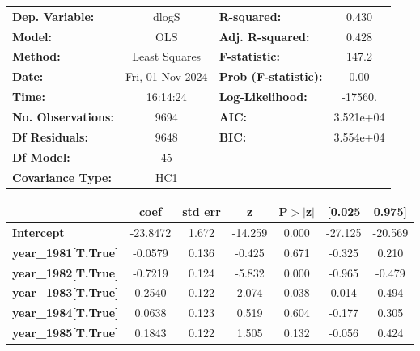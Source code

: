 \begin{center}
\begin{tabular}{lclc}
\toprule
\textbf{Dep. Variable:}     &      dlogS       & \textbf{  R-squared:         } &     0.430   \\
\textbf{Model:}             &       OLS        & \textbf{  Adj. R-squared:    } &     0.428   \\
\textbf{Method:}            &  Least Squares   & \textbf{  F-statistic:       } &     147.2   \\
\textbf{Date:}              & Fri, 01 Nov 2024 & \textbf{  Prob (F-statistic):} &     0.00    \\
\textbf{Time:}              &     16:14:24     & \textbf{  Log-Likelihood:    } &   -17560.   \\
\textbf{No. Observations:}  &        9694      & \textbf{  AIC:               } & 3.521e+04   \\
\textbf{Df Residuals:}      &        9648      & \textbf{  BIC:               } & 3.554e+04   \\
\textbf{Df Model:}          &          45      & \textbf{                     } &             \\
\textbf{Covariance Type:}   &       HC1        & \textbf{                     } &             \\
\bottomrule
\end{tabular}
\begin{tabular}{lcccccc}
                            & \textbf{coef} & \textbf{std err} & \textbf{z} & \textbf{P$> |$z$|$} & \textbf{[0.025} & \textbf{0.975]}  \\
\midrule
\textbf{Intercept}          &     -23.8472  &        1.672     &   -14.259  &         0.000        &      -27.125    &      -20.569     \\
\textbf{year\_1981[T.True]} &      -0.0579  &        0.136     &    -0.425  &         0.671        &       -0.325    &        0.210     \\
\textbf{year\_1982[T.True]} &      -0.7219  &        0.124     &    -5.832  &         0.000        &       -0.965    &       -0.479     \\
\textbf{year\_1983[T.True]} &       0.2540  &        0.122     &     2.074  &         0.038        &        0.014    &        0.494     \\
\textbf{year\_1984[T.True]} &       0.0638  &        0.123     &     0.519  &         0.604        &       -0.177    &        0.305     \\
\textbf{year\_1985[T.True]} &       0.1843  &        0.122     &     1.505  &         0.132        &       -0.056    &        0.424     \\

\end{tabular}
\end{center}
